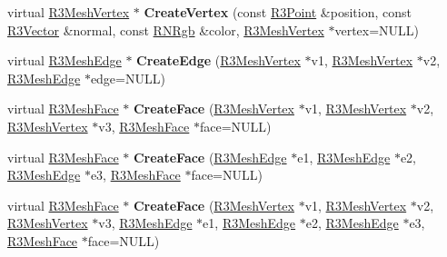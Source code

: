 \begin{DoxyCompactItemize}
\item 
virtual \hyperlink{class_r3_mesh_vertex}{R3\+Mesh\+Vertex} $\ast$ {\bfseries Create\+Vertex} (const \hyperlink{class_r3_point}{R3\+Point} \&position, const \hyperlink{class_r3_vector}{R3\+Vector} \&normal, const \hyperlink{class_r_n_rgb}{R\+N\+Rgb} \&color, \hyperlink{class_r3_mesh_vertex}{R3\+Mesh\+Vertex} $\ast$vertex=N\+U\+LL)\hypertarget{class_r3_mesh_a6b92a202cf1386e05bb8290ba1628ce9}{}\label{class_r3_mesh_a6b92a202cf1386e05bb8290ba1628ce9}

\item 
virtual \hyperlink{class_r3_mesh_edge}{R3\+Mesh\+Edge} $\ast$ {\bfseries Create\+Edge} (\hyperlink{class_r3_mesh_vertex}{R3\+Mesh\+Vertex} $\ast$v1, \hyperlink{class_r3_mesh_vertex}{R3\+Mesh\+Vertex} $\ast$v2, \hyperlink{class_r3_mesh_edge}{R3\+Mesh\+Edge} $\ast$edge=N\+U\+LL)\hypertarget{class_r3_mesh_af5ac6ed5dcc291e13af29c4c4fe18b4a}{}\label{class_r3_mesh_af5ac6ed5dcc291e13af29c4c4fe18b4a}

\item 
virtual \hyperlink{class_r3_mesh_face}{R3\+Mesh\+Face} $\ast$ {\bfseries Create\+Face} (\hyperlink{class_r3_mesh_vertex}{R3\+Mesh\+Vertex} $\ast$v1, \hyperlink{class_r3_mesh_vertex}{R3\+Mesh\+Vertex} $\ast$v2, \hyperlink{class_r3_mesh_vertex}{R3\+Mesh\+Vertex} $\ast$v3, \hyperlink{class_r3_mesh_face}{R3\+Mesh\+Face} $\ast$face=N\+U\+LL)\hypertarget{class_r3_mesh_af3fa20cbbdb989dd1132a51858fc4645}{}\label{class_r3_mesh_af3fa20cbbdb989dd1132a51858fc4645}

\item 
virtual \hyperlink{class_r3_mesh_face}{R3\+Mesh\+Face} $\ast$ {\bfseries Create\+Face} (\hyperlink{class_r3_mesh_edge}{R3\+Mesh\+Edge} $\ast$e1, \hyperlink{class_r3_mesh_edge}{R3\+Mesh\+Edge} $\ast$e2, \hyperlink{class_r3_mesh_edge}{R3\+Mesh\+Edge} $\ast$e3, \hyperlink{class_r3_mesh_face}{R3\+Mesh\+Face} $\ast$face=N\+U\+LL)\hypertarget{class_r3_mesh_a6e2fa9576cbc0df873b651b4fb9a62bd}{}\label{class_r3_mesh_a6e2fa9576cbc0df873b651b4fb9a62bd}

\item 
virtual \hyperlink{class_r3_mesh_face}{R3\+Mesh\+Face} $\ast$ {\bfseries Create\+Face} (\hyperlink{class_r3_mesh_vertex}{R3\+Mesh\+Vertex} $\ast$v1, \hyperlink{class_r3_mesh_vertex}{R3\+Mesh\+Vertex} $\ast$v2, \hyperlink{class_r3_mesh_vertex}{R3\+Mesh\+Vertex} $\ast$v3, \hyperlink{class_r3_mesh_edge}{R3\+Mesh\+Edge} $\ast$e1, \hyperlink{class_r3_mesh_edge}{R3\+Mesh\+Edge} $\ast$e2, \hyperlink{class_r3_mesh_edge}{R3\+Mesh\+Edge} $\ast$e3, \hyperlink{class_r3_mesh_face}{R3\+Mesh\+Face} $\ast$face=N\+U\+LL)\hypertarget{class_r3_mesh_acf91a0b28a1d8594d088a12acc15906c}{}\label{class_r3_mesh_acf91a0b28a1d8594d088a12acc15906c}


\end{DoxyCompactItemize}
